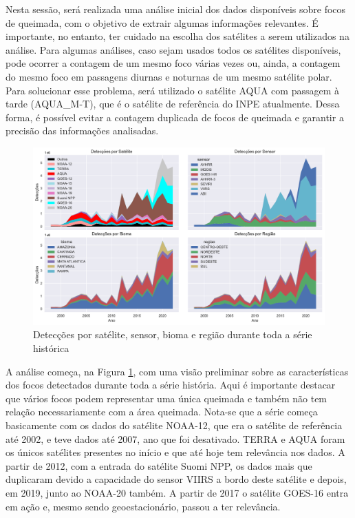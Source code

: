\documentclass[cic,tc]{iiufrgs}
\begin{document}
Nesta sessão, será realizada uma análise inicial dos dados disponíveis sobre focos de queimada, com o objetivo de extrair algumas informações relevantes. É importante, no entanto, ter cuidado na escolha dos satélites a serem utilizados na análise. Para algumas análises, caso sejam usados todos os satélites disponíveis, pode ocorrer a contagem de um mesmo foco várias vezes ou, ainda, a contagem do mesmo foco em passagens diurnas e noturnas de um mesmo satélite polar. Para solucionar esse problema, será utilizado o satélite AQUA com passagem à tarde (AQUA\_M-T), que é o satélite de referência do INPE atualmente. Dessa forma, é possível evitar a contagem duplicada de focos de queimada e garantir a precisão das informações analisadas. \par

\begin{figure}[H]
    \caption{Detecções por satélite, sensor, bioma e região durante toda a série histórica}
    \begin{center}
        \includegraphics[width=35em]{medicoes_nos_anos}
    \end{center}
    \label{fig:medicoes_nos_anos}
\end{figure}

A análise começa, na Figura \ref{fig:medicoes_nos_anos}, com uma visão preliminar sobre as características dos focos detectados durante toda a série história. Aqui é importante destacar que vários focos podem representar uma única queimada e também não tem relação necessariamente com a área queimada. Nota-se que a série começa basicamente com os dados do satélite NOAA-12, que era o satélite de referência até 2002, e teve dados até 2007, ano que foi desativado. TERRA e AQUA foram os únicos satélites presentes no início e que até hoje tem relevância nos dados. A partir de 2012, com a entrada do satélite Suomi NPP, os dados mais que duplicaram devido a capacidade do sensor VIIRS a bordo deste satélite e depois, em 2019, junto ao NOAA-20 também. A partir de 2017 o satélite GOES-16 entra em ação e, mesmo sendo geoestacionário, passou a ter relevância. \par
\end{document}
